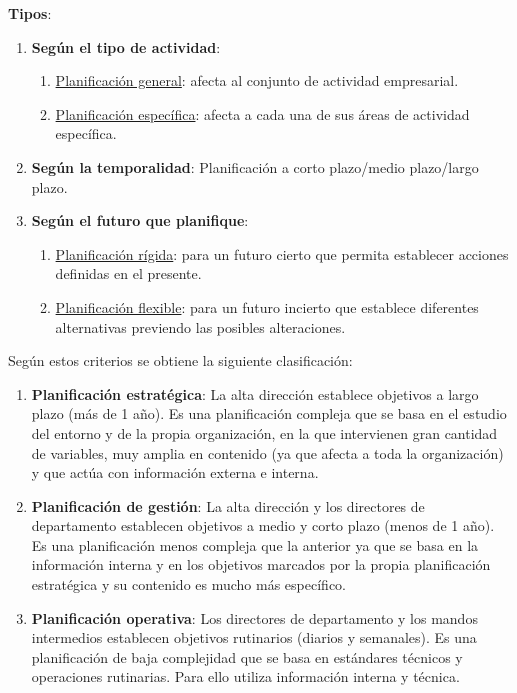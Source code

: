 \documentclass[12pt]{article}
\theoremstyle{definition_wo_parentheses}
\begin{document}
\textbf{Tipos}:
\begin{enumerate}
\item \textbf{Según el tipo de actividad}:
\begin{enumerate}
\item \underline{Planificación general}: afecta al conjunto de actividad empresarial.
\item \underline{Planificación específica}: afecta a cada una de sus áreas de actividad específica.
\end{enumerate}
\item \textbf{Según la temporalidad}: Planificación a corto plazo/medio plazo/largo plazo.
\item \textbf{Según el futuro que planifique}:
\begin{enumerate}
\item \underline{Planificación rígida}: para un futuro cierto que permita establecer acciones definidas en el presente.
\item \underline{Planificación flexible}: para un futuro incierto que establece diferentes alternativas previendo las posibles alteraciones.
\end{enumerate}
\end{enumerate}

Según estos criterios se obtiene la siguiente clasificación:
\begin{enumerate}
\item \textbf{Planificación estratégica}: La alta dirección establece objetivos a largo plazo (más de 1 año). Es una planificación compleja que se basa en el estudio del entorno y de la propia organización, en la que intervienen gran cantidad de variables, muy amplia en contenido (ya que afecta a toda la organización) y que actúa con información externa e interna.
\item \textbf{Planificación de gestión}: La alta dirección y los directores de departamento establecen objetivos a medio y corto plazo (menos de 1 año). Es una planificación menos compleja que la anterior ya que se basa en la información interna y en los objetivos marcados por la propia planificación estratégica y su contenido es mucho más específico.
\item \textbf{Planificación operativa}: Los directores de departamento y los mandos intermedios establecen objetivos rutinarios (diarios y semanales). Es una planificación de baja complejidad que se basa en estándares técnicos y operaciones rutinarias. Para ello utiliza información interna y técnica.
\end{enumerate}
\end{document}
